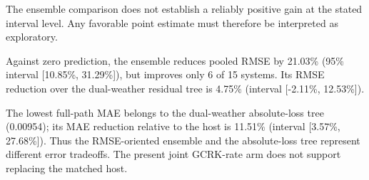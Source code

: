 The ensemble comparison does not establish a reliably positive gain at the stated interval level. Any favorable point estimate must therefore be interpreted as exploratory.

Against zero prediction, the ensemble reduces pooled RMSE by 21.03\% (95\% interval [10.85\%, 31.29\%]), but improves only 6 of 15 systems. Its RMSE reduction over the dual-weather residual tree is 4.75\% (interval [-2.11\%, 12.53\%]).

The lowest full-path MAE belongs to the dual-weather absolute-loss tree (0.00954); its MAE reduction relative to the host is 11.51\% (interval [3.57\%, 27.68\%]). Thus the RMSE-oriented ensemble and the absolute-loss tree represent different error tradeoffs. The present joint GCRK-rate arm does not support replacing the matched host.
